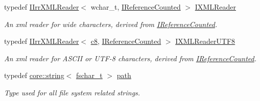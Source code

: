 \begin{DoxyCompactItemize}
typedef \hyperlink{classirr_1_1io_1_1IIrrXMLReader}{I\+Irr\+X\+M\+L\+Reader}$<$ wchar\+\_\+t, \hyperlink{classirr_1_1IReferenceCounted}{I\+Reference\+Counted} $>$ \hyperlink{namespaceirr_1_1io_a9dc6291fb7e4c73155a3e3c8339f9bff}{I\+X\+M\+L\+Reader}
\begin{DoxyCompactList}\small\item\em An xml reader for wide characters, derived from \hyperlink{classirr_1_1IReferenceCounted}{I\+Reference\+Counted}. \end{DoxyCompactList}\item 
typedef \hyperlink{classirr_1_1io_1_1IIrrXMLReader}{I\+Irr\+X\+M\+L\+Reader}$<$ \hyperlink{namespaceirr_a9395eaea339bcb546b319e9c96bf7410}{c8}, \hyperlink{classirr_1_1IReferenceCounted}{I\+Reference\+Counted} $>$ \hyperlink{namespaceirr_1_1io_a2dedc8156931082e6b147b562195e310}{I\+X\+M\+L\+Reader\+U\+T\+F8}
\begin{DoxyCompactList}\small\item\em An xml reader for A\+S\+C\+II or U\+T\+F-\/8 characters, derived from \hyperlink{classirr_1_1IReferenceCounted}{I\+Reference\+Counted}. \end{DoxyCompactList}\item 
typedef \hyperlink{classirr_1_1core_1_1string}{core\+::string}$<$ \hyperlink{namespaceirr_a813cca9bac9fa0c1427d89720a451460}{fschar\+\_\+t} $>$ \hyperlink{namespaceirr_1_1io_ab1bdc45edb3f94d8319c02bc0f840ee1}{path}
\begin{DoxyCompactList}\small\item\em Type used for all file system related strings. \end{DoxyCompactList}\end{DoxyCompactItemize}
